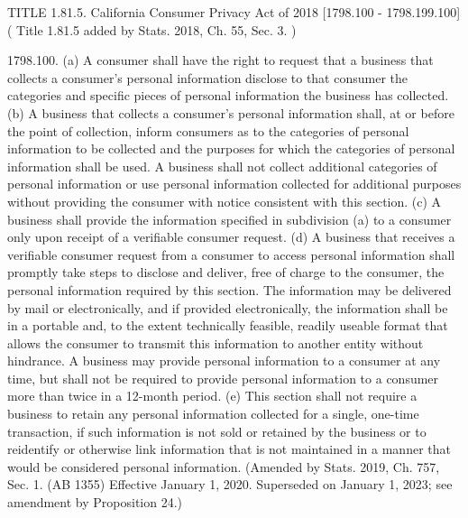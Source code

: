 TITLE 1.81.5. California Consumer Privacy Act of 2018 [1798.100 - 1798.199.100]  ( Title 1.81.5 added by Stats. 2018, Ch. 55, Sec. 3. )

1798.100.  (a) A consumer shall have the right to request that a business that collects a consumer’s personal information disclose to that consumer the categories and specific pieces of personal information the business has collected.
(b) A business that collects a consumer’s personal information shall, at or before the point of collection, inform consumers as to the categories of personal information to be collected and the purposes for which the categories of personal information shall be used. A business shall not collect additional categories of personal information or use personal information collected for additional purposes without providing the consumer with notice consistent with this section.
(c) A business shall provide the information specified in subdivision (a) to a consumer only upon receipt of a verifiable consumer request.
(d) A business that receives a verifiable consumer request from a consumer to access personal information shall promptly take steps to disclose and deliver, free of charge to the consumer, the personal information required by this section. The information may be delivered by mail or electronically, and if provided electronically, the information shall be in a portable and, to the extent technically feasible, readily useable format that allows the consumer to transmit this information to another entity without hindrance. A business may provide personal information to a consumer at any time, but shall not be required to provide personal information to a consumer more than twice in a 12-month period.
(e) This section shall not require a business to retain any personal information collected for a single, one-time transaction, if such information is not sold or retained by the business or to reidentify or otherwise link information that is not maintained in a manner that would be considered personal information.
(Amended by Stats. 2019, Ch. 757, Sec. 1. (AB 1355) Effective January 1, 2020. Superseded on January 1, 2023; see amendment by Proposition 24.)

